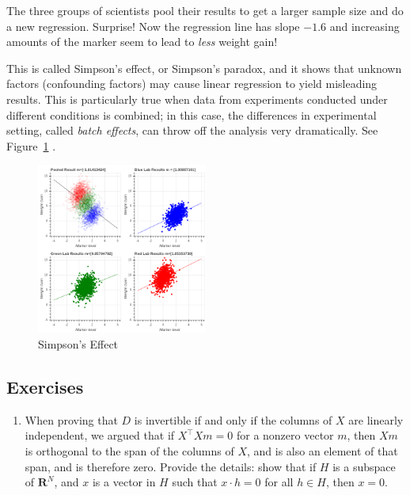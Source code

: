 \documentclass[
  11pt,
  letterpaper,
]{scrbook}
\providecommand{\tightlist}{%
  \setlength{\itemsep}{0pt}\setlength{\parskip}{0pt}}\usepackage{longtable,booktabs,array}
\theoremstyle{plain}
\theoremstyle{plain}
\theoremstyle{remark}
\begin{document}
The three groups of scientists pool their results to get a larger sample
size and do a new regression. Surprise! Now the regression line has
slope \(-1.6\) and increasing amounts of the marker seem to lead to
\emph{less} weight gain!

This is called Simpson's effect, or Simpson's paradox, and it shows that
unknown factors (confounding factors) may cause linear regression to
yield misleading results. This is particularly true when data from
experiments conducted under different conditions is combined; in this
case, the differences in experimental setting, called \emph{batch
effects}, can throw off the analysis very dramatically. See
Figure~\ref{fig-simpsons} .

\begin{figure}

{\centering \includegraphics[width=0.5\textwidth,height=\textheight]{chapters/img/SimpsonsEffect.png}

}

\caption{\label{fig-simpsons}Simpson's Effect}

\end{figure}

\hypertarget{exercises-1}{%
\subsection{Exercises}\label{exercises-1}}

\begin{enumerate}
\def\labelenumi{\arabic{enumi}.}
\tightlist
\item
  When proving that \(D\) is invertible if and only if the columns of
  \(X\) are linearly independent, we argued that if
  \(X^{\intercal}Xm=0\) for a nonzero vector \(m\), then \(Xm\) is
  orthogonal to the span of the columns of \(X\), and is also an element
  of that span, and is therefore zero. Provide the details: show that if
  \(H\) is a subspace of \(\mathbf{R}^{N}\), and \(x\) is a vector in
  \(H\) such that \(x\cdot h=0\) for all \(h\in H\), then \(x=0\).
\end{enumerate}
\end{document}
